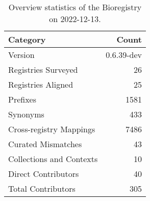 \begin{table}
\centering
\caption{Overview statistics of the Bioregistry on 2022-12-13.}
\label{tab:bioregistry-summary}
\begin{tabular}{lr}
\toprule
                Category &      Count \\
\midrule
                 Version & 0.6.39-dev \\
     Registries Surveyed &         26 \\
      Registries Aligned &         25 \\
                Prefixes &       1581 \\
                Synonyms &        433 \\
 Cross-registry Mappings &       7486 \\
      Curated Mismatches &         43 \\
Collections and Contexts &         10 \\
     Direct Contributors &         40 \\
      Total Contributors &        305 \\
\bottomrule
\end{tabular}
\end{table}
